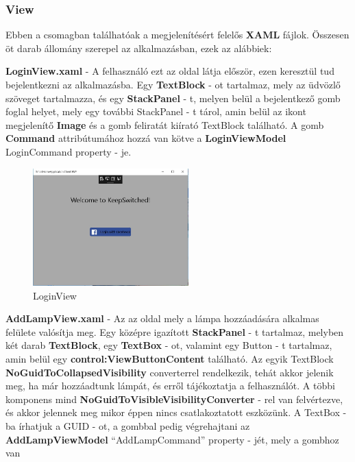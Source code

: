 \documentclass[a4paper,12pt]{report}
\begin{document}
    \subsubsection{View}
    Ebben a csomagban találhatóak a megjelenítésért felelős \textbf{XAML} fájlok. Összesen öt darab állomány szerepel az alkalmazásban,
    ezek az alábbiek:

    \textbf{LoginView.xaml} - A felhasználó ezt az oldal látja először, ezen keresztül tud bejelentkezni az alkalmazásba. Egy \textbf{TextBlock} - ot
    tartalmaz, mely az üdvözlő szöveget tartalmazza, és egy \textbf{StackPanel} - t, melyen belül a bejelentkező gomb foglal helyet, mely egy további
    StackPanel - t tárol, amin belül az ikont megjelenítő \textbf{Image} és a gomb feliratát kiírató TextBlock található.  A gomb \textbf{Command}
    attribútumához hozzá van kötve a \textbf{LoginViewModel} LoginCommand property - je.

    \begin{figure}[H]
        \centering
        \includegraphics[width=6cm,keepaspectratio]{images/loginview.jpg}
        \caption{LoginView}
        \label{fig: LoginView}
    \end{figure}

    \textbf{AddLampView.xaml} - Az az oldal mely a lámpa hozzáadására alkalmas felülete valósítja meg. Egy középre igazított \textbf{StackPanel} - t
    tartalmaz, melyben két darab \textbf{TextBlock}, egy \textbf{TextBox} - ot, valamint egy Button - t tartalmaz, amin belül egy \textbf{control:ViewButtonContent}
    található. Az egyik TextBlock \textbf{NoGuidToCollapsedVisibility} converterrel rendelkezik, tehát akkor jelenik meg, ha már hozzáadtunk lámpát,
    és erről tájékoztatja a felhasználót. A többi komponens mind \textbf{NoGuidToVisibleVisibilityConverter} - rel van felvértezve, és akkor
    jelennek meg mikor éppen nincs csatlakoztatott eszközünk. A TextBox - ba írhatjuk a GUID - ot, a gombbal pedig végrehajtani az \textbf{AddLampViewModel}
    ``AddLampCommand'' property - jét, mely a gombhoz van
\end{document}
